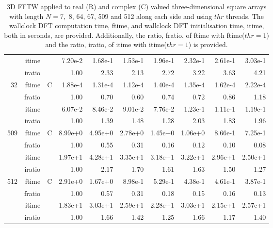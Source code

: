 \documentclass[a4paper]{article}
\begin{document}
\begin{table}
\begin{center}
\begin{tabular}{|r|r|r|r|r|r|r|r|r|r|}
     & itime & &       7.20e-2 &   1.68e-1 &   1.53e-1 &   1.96e-1 &   2.32e-1 &   2.61e-1 &   3.03e-1     \\ 
     & iratio & &      1.00 &   2.33 &   2.13 &   2.72 &   3.22 &   3.63 &   4.21         \\ \hline 
   32  & ftime & C  &  1.88e-4 &   1.31e-4 &   1.12e-4 &   1.40e-4 &   1.35e-4 &   1.62e-4 &   2.22e-4    \\ 
      & fratio & &     1.00 &   0.70 &   0.60 &   0.74 &   0.72 &   0.86 &   1.18      \\ 
     & itime & &       6.07e-2 &   8.46e-2 &   9.01e-2 &   7.76e-2 &   1.23e-1 &   1.11e-1 &   1.19e-1        \\ 
     & iratio & &      1.00 &   1.39 &   1.48 &   1.28 &   2.03 &   1.83 &   1.96       \\ \hline 
  509  & ftime & C  &  8.99e+0 &   4.95e+0 &   2.78e+0 &   1.45e+0 &   1.06e+0 &   8.66e-1 &   7.25e-1    \\ 
      & fratio & &     1.00 &   0.55 &   0.31 &   0.16 &   0.12 &   0.10 &   0.08    \\ 
     & itime & &       1.97e+1 &   4.28e+1 &   3.35e+1 &   3.18e+1 &   3.22e+1 &   2.96e+1 &   2.50e+1       \\ 
     & iratio & &      1.00 &   2.17 &   1.70 &   1.61 &   1.63 &   1.50 &   1.27       \\ \hline 
  512  & ftime & C  &  2.91e+0 &   1.67e+0 &   8.98e-1 &   5.29e-1 &   4.38e-1 &   4.61e-1 &   3.87e-1     \\ 
      & fratio & &     1.00 &   0.57 &   0.31 &   0.18 &   0.15 &   0.16 &   0.13       \\ 
     & itime & &       1.83e+1 &   3.03e+1 &   2.59e+1 &   2.28e+1 &   3.03e+1 &   2.15e+1 &   2.57e+1       \\ 
     & iratio & &      1.00 &   1.66 &   1.42 &   1.25 &   1.66 &   1.17 &   1.40       \\ \hline
\end{tabular}
\caption{3D FFTW applied to real (R) and complex (C) valued three-dimensional square arrays with length
  $N=7,$ 8, 64, 67, 509 and 512 along each side and using $thr$ threads. The wallclock DFT computation time,
  ftime, and wallclock DFT initialisation time, itime, both in seconds, are provided. Additionally,  the ratio,
  fratio, of ftime  with ftime($thr=1$) and the ratio, iratio, of itime  with itime($thr=1$) is provided. }\label{Tbl:FFTW3d}
\end{center}
\end{table}
\end{document}
